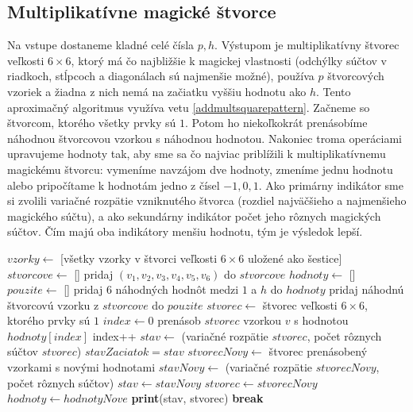 \subsection{Multiplikatívne magické štvorce} 

\begin{alg}
\label{algsquare6x6mm}
Na vstupe dostaneme kladné celé čísla $p, h$. Výstupom je multiplikatívny štvorec veľkosti $6 \times 6$, ktorý má čo najbližšie k magickej vlastnosti (odchýlky súčtov v riadkoch, stĺpcoch a diagonálach sú najmenšie možné), používa $p$ štvorcových vzoriek a žiadna z nich nemá na začiatku vyššiu hodnotu ako $h$. Tento aproximačný algoritmus využíva vetu \ref{addmultsquarepattern}. Začneme so štvorcom, ktorého všetky prvky sú $1$. Potom ho niekoľkokrát prenásobíme náhodnou štvorcovou vzorkou s náhodnou hodnotou. Nakoniec troma operáciami upravujeme hodnoty tak, aby sme sa čo najviac priblížili k multiplikatívnemu magickému štvorcu: vymeníme navzájom dve hodnoty, zmeníme jednu hodnotu alebo pripočítame k hodnotám jedno z čísel $-1, 0, 1$. Ako primárny indikátor sme si zvolili variačné rozpätie vzniknutého štvorca (rozdiel najväčšieho a najmenšieho magického súčtu), a ako sekundárny indikátor počet jeho rôznych magických súčtov. Čím majú oba indikátory menšiu hodnotu, tým je výsledok lepší.
\end{alg}

\begin{algorithmic}
\STATE $vzorky \gets$ [všetky vzorky v štvorci veľkosti $6 \times 6$ uložené ako šestice]
\STATE $stvorcove \gets $ []
	\STATE pridaj $(v_1,v_2,v_3,v_4,v_5,v_6)$ do $stvorcove$
    \ENDIF
\ENDFOR
{}
	\STATE $hodnoty \gets$ []
	\STATE $pouzite \gets$ []
		\STATE pridaj $6$ náhodných hodnôt medzi $1$ a $h$ do $hodnoty$
		\STATE pridaj náhodnú štvorcovú vzorku z $stvorcove$ do $pouzite$
	\ENDFOR
		\STATE $stvorec \gets$ štvorec veľkosti $6 \times 6$, ktorého prvky sú $1$
		\STATE $index \gets 0$
				\STATE prenásob $stvorec$ vzorkou $v$ s hodnotou $hodnoty[index]$
				\STATE index++
			\ENDFOR
		\ENDFOR
			\STATE $stav \gets$ (variačné rozpätie $stvorec$, počet rôznych súčtov $stvorec$)
			\STATE $stavZaciatok = stav$
				\STATE $stvorecNovy \gets$ štvorec prenásobený vzorkami s novými hodnotami
				\STATE $stavNovy \gets$ (variačné rozpätie $stvorecNovy$, počet rôznych súčtov)
					\STATE $stav \gets stavNovy$
					\STATE $stvorec \gets stvorecNovy$
					\STATE $hodnoty \gets hodnotyNove$
				\ENDIF
			\ENDFOR
				\STATE \textbf{print}(stav, stvorec)
				\STATE \textbf{break}
			\ENDIF
		\ENDIF
	\ENDWHILE
\ENDWHILE
\end{algorithmic}

